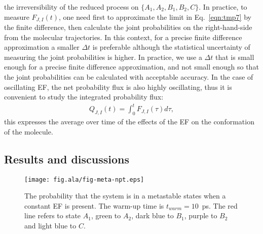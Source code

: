 \documentclass[a4paper,preprint,unsortedaddress,onecolumn]{revtex4-1}
\begin{document}
the irreversibility of the reduced process on
$\{A_1, A_2, B_1, B_2, C\}$.
In practice, to measure $ F_{J,I}(t)$, one need first to approximate the limit
in Eq.~\eqref{eqn:tmp7} by the finite difference,
then calculate the joint probabilities on
the right-hand-side from the molecular trajectories.
In this context, for a precise finite difference approximation a smaller $\Delta t$ is
preferable although the statistical uncertainty of measuring the joint probabilities
is higher. In practice,
we use a $\Delta t$ that is small enough for a precise finite difference approximation,
and not small enough so that the joint probabilities can be calculated with acceptable accuracy.
In the case of oscillating EF, the net probability flux is also highly oscillating,
thus it is convenient to study the integrated probability flux:
\begin{align}
  Q_{J,I} (t) = \int_0^t F_{J,I}(\tau)d \tau,
\end{align}
this expresses the average over time of the effects of the EF on the conformation of the molecule.





\subsection{Results and discussions}


\begin{figure}
  \centering
  \texttt{[image: fig.ala/fig-meta-npt.eps]}
  \caption{The probability that the system is in a metastable states when a constant EF is present.
    The warm-up time is $t_{warm} = 10$~ps. The red line refers to state $A_1$,
    green to $A_2$, dark blue to $B_1$, purple to $B_2$ and light blue
    to $C$.
  }
  \label{fig:tmp5}
\end{figure}
\end{document}
